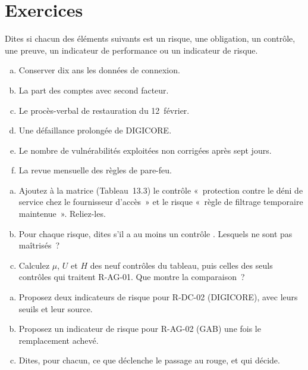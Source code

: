 \section*{Exercices}

\begin{boxexo}[title={\ding{45}\quad Exercice~13.1. Classer \niveaubase}]
Dites si chacun des éléments suivants est un risque, une obligation, un
contrôle, une preuve, un indicateur de performance ou un indicateur de
risque.
\begin{enumerate}[(a)]
    \item Conserver dix ans les données de connexion.
    \item La part des comptes avec second facteur.
    \item Le procès-verbal de restauration du 12~février.
    \item Une défaillance prolongée de DIGICORE.
    \item Le nombre de vulnérabilités exploitées non corrigées après sept
          jours.
    \item La revue mensuelle des règles de pare-feu.
\end{enumerate}
\end{boxexo}

\begin{boxexo}[title={\ding{45}\quad Exercice~13.2. Compléter la matrice \niveaumoyen}]
\begin{enumerate}[(a)]
    \item Ajoutez à la matrice (Tableau~13.3) le contrôle «~protection
          contre le déni de service chez le fournisseur d'accès~» et le
          risque «~règle de filtrage temporaire maintenue~». Reliez-les.
    \item Pour chaque risque, dites s'il a au moins un contrôle \OUI{}.
          Lesquels ne sont pas maîtrisés~?
    \item Calculez $\mu$, $U$ et $H$ des neuf contrôles du tableau, puis
          celles des seuls contrôles qui traitent R-AG-01. Que montre la
          comparaison~?
\end{enumerate}
\end{boxexo}

\begin{boxexo}[title={\ding{45}\quad Exercice~13.3. Des indicateurs pour les prestataires \niveaumoyen}]
\begin{enumerate}[(a)]
    \item Proposez deux indicateurs de risque pour R-DC-02 (DIGICORE), avec
          leurs seuils et leur source.
    \item Proposez un indicateur de risque pour R-AG-02 (GAB) une fois le
          remplacement achevé.
    \item Dites, pour chacun, ce que déclenche le passage au rouge, et qui
          décide.
\end{enumerate}
\end{boxexo}

